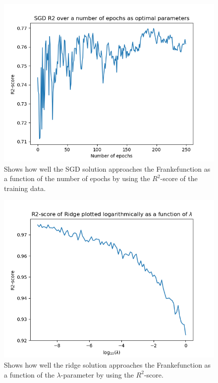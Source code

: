 \documentclass[a4paper, UKenglish]{article}
\newcommand{\0}{\mathbf{0}}
\newcommand{\1}{\mathbf{1}}
\begin{document}
\begin{figure}[H]
        \centering 
        \includegraphics[scale=0.7]{images/partA_R2.png} 
        \caption{Shows how well the SGD solution approaches the Frankefunction as a function of the number of epochs by using the $R^2$-score of the training data.}
        \label{fig:partA_R2}
\end{figure}


\begin{figure}[H]
        \centering 
        \includegraphics[scale=0.7]{images/partA_ridge.png} 
        \caption{Shows how well the ridge solution approaches the Frankefunction as a function of the $\lambda$-parameter by using the $R^2$-score.}
        \label{fig:partA_ridge}
\end{figure}
\end{document}

